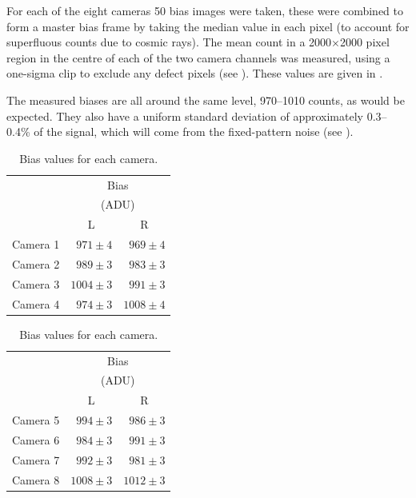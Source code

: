 \begin{colsection}
\begin{colsection}
For each of the eight cameras 50 bias images were taken, these were combined to form a master bias frame by taking the median value in each pixel (to account for superfluous counts due to cosmic rays). The mean count in a 2000$\times$2000 pixel region in the centre of each of the two camera channels was measured, using a one-sigma clip to exclude any defect pixels (see ). These values are given in .

The measured biases are all around the same level, 970--1010 counts, as would be expected. They also have a uniform standard deviation of approximately 0.3--0.4\% of the signal, which will come from the fixed-pattern noise (see ).

\begin{table}[t]
    \begin{center}
        \begin{tabular}{c|rr} %
             & \multicolumn{2}{c}{Bias} \\
             & \multicolumn{2}{c}{(ADU)} \\
             & \multicolumn{1}{c}{L} & \multicolumn{1}{c}{R} \\
            \midrule
            Camera 1 & $971\pm4$ & $969\pm4$ \\
            Camera 2 & $989\pm3$ & $983\pm3$ \\
            Camera 3 & $1004\pm3$ & $991\pm3$ \\
            Camera 4 & $974\pm3$ & $1008\pm4$ \\
        \end{tabular}
        \hspace{0.5cm}
        \begin{tabular}{c|rr} %
             & \multicolumn{2}{c}{Bias} \\
             & \multicolumn{2}{c}{(ADU)} \\
             & \multicolumn{1}{c}{L} & \multicolumn{1}{c}{R} \\
            \midrule
            Camera 5 & $994\pm3$ & $986\pm3$ \\
            Camera 6 & $984\pm3$ & $991\pm3$ \\
            Camera 7 & $992\pm3$ & $981\pm3$ \\
            Camera 8 & $1008\pm3$ & $1012\pm3$ \\
        \end{tabular}
    \end{center}
    \caption[Bias values]{
        Bias values for each camera.
    }\label{tab:bias}
\end{table}


\end{colsection}
\end{colsection}
